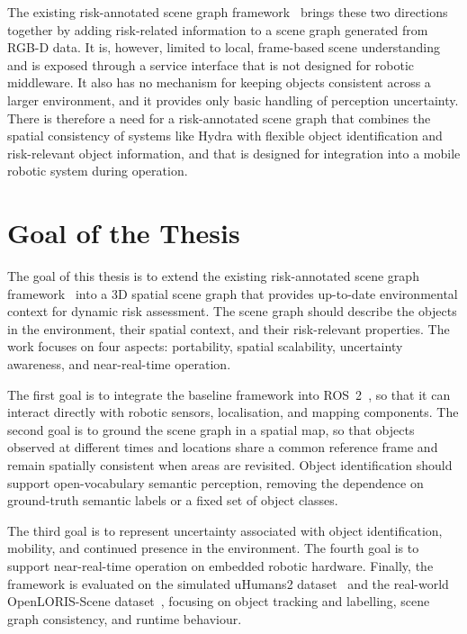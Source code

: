 {\small The existing risk-annotated scene graph framework~\cite{previous_rsg_thesis} brings these two directions together by adding risk-related information to a scene graph generated from RGB-D data. It is, however, limited to local, frame-based scene understanding and is exposed through a service interface that is not designed for robotic middleware. It also has no mechanism for keeping objects consistent across a larger environment, and it provides only basic handling of perception uncertainty. There is therefore a need for a risk-annotated scene graph that combines the spatial consistency of systems like Hydra with flexible object identification and risk-relevant object information, and that is designed for integration into a mobile robotic system during operation.\par}

\section{Goal of the Thesis}
\label{sec:goal_of_thesis}

{\small The goal of this thesis is to extend the existing risk-annotated scene graph framework~\cite{previous_rsg_thesis} into a 3D spatial scene graph that provides up-to-date environmental context for dynamic risk assessment. The scene graph should describe the objects in the environment, their spatial context, and their risk-relevant properties. The work focuses on four aspects: portability, spatial scalability, uncertainty awareness, and near-real-time operation.\par}

{\small The first goal is to integrate the baseline framework into ROS~2~\cite{macenski2022ros2}, so that it can interact directly with robotic sensors, localisation, and mapping components. The second goal is to ground the scene graph in a spatial map, so that objects observed at different times and locations share a common reference frame and remain spatially consistent when areas are revisited. Object identification should support open-vocabulary semantic perception, removing the dependence on ground-truth semantic labels or a fixed set of object classes.\par}

{\small The third goal is to represent uncertainty associated with object identification, mobility, and continued presence in the environment. The fourth goal is to support near-real-time operation on embedded robotic hardware. Finally, the framework is evaluated on the simulated uHumans2 dataset~\cite{rosinol2021kimera} and the real-world OpenLORIS-Scene dataset~\cite{shi2020openloris}, focusing on object tracking and labelling, scene graph consistency, and runtime behaviour.\par}

